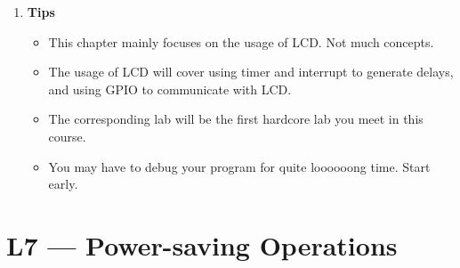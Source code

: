 \documentclass[a4paper]{article}
\begin{document}
\begin{enumerate}[label = \arabic*.]
    \item \textbf{Tips}
      \begin{itemize}[leftmargin = 1cm]
        \item This chapter mainly focuses on the usage of LCD\@. Not much concepts.
        \item The usage of LCD will cover using timer and interrupt to generate delays, and using GPIO to communicate with LCD\@.
        \item The corresponding lab will be the first hardcore lab you meet in this course.
        \item You may have to debug your program for quite loooooong time. Start early.
      \end{itemize}
  \end{enumerate}

\section*{L7 --- Power-saving Operations}
\end{document}
